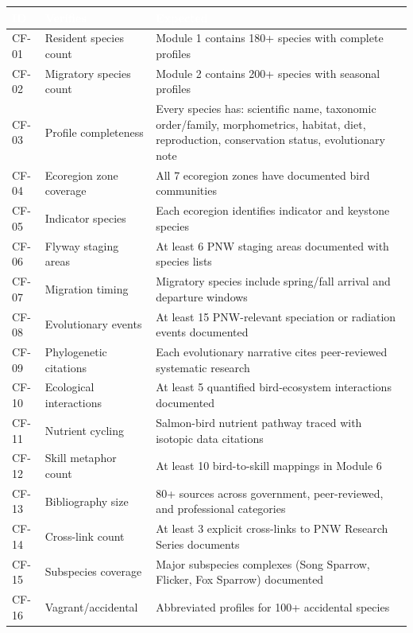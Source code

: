 \documentclass[11pt,letterpaper]{article}
\newcommand{\tableheader}[1]{\textbf{\sffamily\textcolor{white}{#1}}}
\begin{document}
\begin{center}
\small
\begin{tabularx}{\textwidth}{C{1.2cm}L{3cm}X}
\toprule
{}
\tableheader{ID} & \tableheader{Verifies} & \tableheader{Expected} \\
\midrule
CF-01 & Resident species count & Module 1 contains 180+ species with complete profiles \\
CF-02 & Migratory species count & Module 2 contains 200+ species with seasonal profiles \\
CF-03 & Profile completeness & Every species has: scientific name, taxonomic order/family, morphometrics, habitat, diet, reproduction, conservation status, evolutionary note \\
CF-04 & Ecoregion zone coverage & All 7 ecoregion zones have documented bird communities \\
CF-05 & Indicator species & Each ecoregion identifies indicator and keystone species \\
CF-06 & Flyway staging areas & At least 6 PNW staging areas documented with species lists \\
CF-07 & Migration timing & Migratory species include spring/fall arrival and departure windows \\
CF-08 & Evolutionary events & At least 15 PNW-relevant speciation or radiation events documented \\
CF-09 & Phylogenetic citations & Each evolutionary narrative cites peer-reviewed systematic research \\
CF-10 & Ecological interactions & At least 5 quantified bird-ecosystem interactions documented \\
CF-11 & Nutrient cycling & Salmon-bird nutrient pathway traced with isotopic data citations \\
CF-12 & Skill metaphor count & At least 10 bird-to-skill mappings in Module 6 \\
CF-13 & Bibliography size & 80+ sources across government, peer-reviewed, and professional categories \\
CF-14 & Cross-link count & At least 3 explicit cross-links to PNW Research Series documents \\
CF-15 & Subspecies coverage & Major subspecies complexes (Song Sparrow, Flicker, Fox Sparrow) documented \\
CF-16 & Vagrant/accidental & Abbreviated profiles for 100+ accidental species \\
\bottomrule
\end{tabularx}
\end{center}
\end{document}
